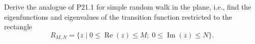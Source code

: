 Derive the analogue of P21.1 for simple random walk in the plane, i.e., find the eigenfunctions and eigenvalues of the transition function restricted to the rectangle
\[
R_{M,N} = \{z \mid 0 \leq \operatorname{Re}(z) \leq M; \; 0 \leq \operatorname{Im}(z) \leq N\}.
\]
